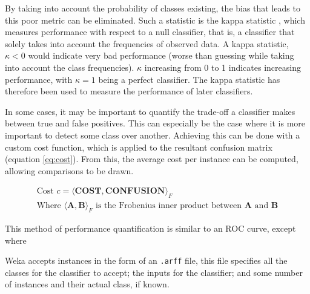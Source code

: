 By taking into account the probability of classes existing, the bias that leads to this poor metric can be eliminated. Such a statistic is the kappa statistic , which measures performance with respect to a null classifier, that is, a classifier that solely takes into account the frequencies of observed data. A kappa statistic, $\kappa < 0$  would indicate very bad performance (worse than guessing while taking into account the class frequencies). $\kappa$ increasing from 0 to 1 indicates increasing performance, with $\kappa = 1$ being a perfect classifier. The kappa statistic has therefore been used to measure the performance of later classifiers.

In some cases, it may be important to quantify the trade-off a classifier makes between true and false positives. This can especially be the case where it is more important to detect some class over another. Achieving this can be done with a custom cost function, which is applied to the resultant confusion matrix (equation \ref{eq:cost}). From this, the average cost per instance can be computed, allowing comparisons to be drawn.

\begin{equation}
	\label{eq:cost}
	\begin{gathered}
		\text{Cost } c = \langle \mathbf{COST}, \mathbf{CONFUSION} \rangle_F \\
		\text{Where $\langle \mathbf{A}, \mathbf{B}\rangle_F$ is the Frobenius inner product between $\mathbf{A}$ and $\mathbf{B}$}
	\end{gathered}
\end{equation}

This method of performance quantification is similar to an ROC curve, except where 

Weka accepts instances in the form of an \texttt{.arff} file, this file specifies all the classes for the classifier to accept; the inputs for the classifier; and some number of instances and their actual class, if known.


